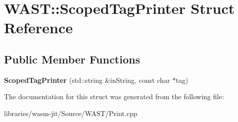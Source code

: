 \hypertarget{struct_w_a_s_t_1_1_scoped_tag_printer}{}\section{W\+A\+ST\+:\+:Scoped\+Tag\+Printer Struct Reference}
\label{struct_w_a_s_t_1_1_scoped_tag_printer}
\subsection*{Public Member Functions}
\begin{DoxyCompactItemize}
\item 
\mbox{\label{struct_w_a_s_t_1_1_scoped_tag_printer_a0e8f6f09df52e578f237fbaed0e3f45b}} 
{\bfseries Scoped\+Tag\+Printer} (std\+::string \&in\+String, const char $\ast$tag)
\end{DoxyCompactItemize}


The documentation for this struct was generated from the following file\+:\begin{DoxyCompactItemize}
\item 
libraries/wasm-\/jit/\+Source/\+W\+A\+S\+T/Print.\+cpp\end{DoxyCompactItemize}
